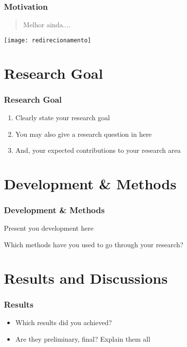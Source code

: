 \documentclass[10pt, aspectratio=169]{beamer}
\begin{document}
\begin{frame}
	\frametitle{Motivation}
	
	\begin{quotation}
		\Large{Melhor ainda....}
	\end{quotation}
	\begin{center}
		
		\texttt{[image: redirecionamento]}
	\end{center}
	
	
	
	
	\vfill
	\vfill
	
\end{frame}



\section{Research Goal}
\begin{frame}
  \frametitle{Research Goal}

  \begin{enumerate}
  \item \vfill Clearly state your research goal \pause
  \item \vfill You may also give a research question in here \pause
  \item \vfill And, your expected contributions to your research area
  \end{enumerate}
\end{frame}

\section{Development \& Methods}
\begin{frame}
  \frametitle{Development \& Methods}
  Present you development here

  \vfill
  Which methods have you used to go through your research?
\end{frame}

\section{Results and Discussions}
\begin{frame}
  \frametitle{Results}

  \begin{itemize}
  \item Which results did you achieved? \pause
  \item Are they preliminary, final? Explain them all
  \end{itemize}		
\end{frame}
\end{document}
